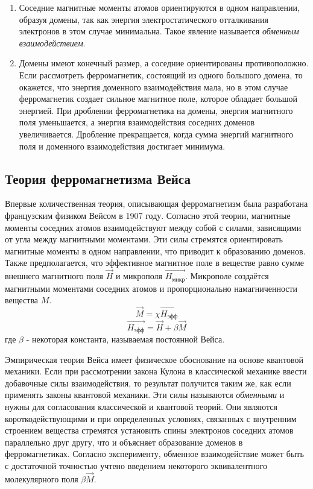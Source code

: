 \begin{enumerate}
	\item Соседние магнитные моменты атомов ориентируются в одном направлении, образуя домены, так как энергия электростатического отталкивания электронов в этом случае минимальна. Такое явление называется \textit{обменным взаимодействием}.
	
	\item Домены имеют конечный размер, а соседние ориентированы противоположно. Если рассмотреть ферромагнетик, состоящий из одного большого домена, то окажется, что энергия доменного взаимодействия мала, но в этом случае ферромагнетик создает сильное магнитное поле, которое обладает большой энергией. При дроблении ферромагнетика на домены, энергия магнитного поля уменьшается, а энергия взаимодействия соседних доменов увеличивается. Дробление прекращается, когда сумма энергий магнитного поля и доменного взаимодействия достигает минимума.
\end{enumerate}

\subsection*{Теория ферромагнетизма Вейса}

Впервые количественная теория, описывающая ферромагнетизм была разработана французским физиком Вейсом в 1907 году. Согласно этой теории, магнитные моменты соседних атомов взаимодействуют между собой с силами, зависящими от угла между магнитными моментами. Эти силы стремятся ориентировать магнитные моменты в одном направлении, что приводит к образованию доменов. Также предполагается, что эффективное магнитное поле в веществе равно сумме внешнего магнитного поля $\vec{H}$ и микрополя $\vec{H_{микр}}$. Микрополе создаётся магнитными моментами соседних атомов и пропорционально намагниченности вещества $M$.
$$
\vec{M} = \chi \vec{H_{эфф}}
$$
$$
\vec{H_{эфф}} = \vec{H} + \beta \vec{M}
$$
где $\beta$ - некоторая константа, называемая постоянной Вейса.

Эмпирическая теория Вейса имеет физическое обоснование на основе квантовой механики. Если при рассмотрении закона Кулона в классической механике ввести добавочные силы взаимодействия, то результат получится таким же, как если применять законы квантовой механики. Эти силы называются \textit{обменными} и нужны для согласования классической и квантовой теорий. Они являются короткодействующими и при определенных условиях, связанных с внутренним строением вещества стремятся установить спины электронов соседних атомов параллельно друг другу, что и объясняет образование доменов в ферромагнетиках. Согласно эксперименту, обменное взаимодействие может быть с достаточной точностью учтено введением некоторого эквивалентного молекулярного поля $\beta \vec{M}$.

